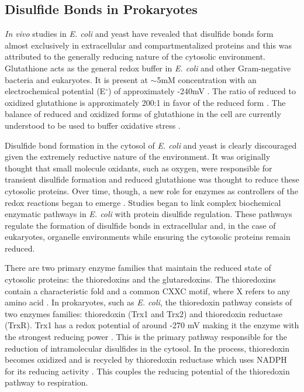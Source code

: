 {\subsection{Disulfide Bonds in Prokaryotes}

\emph{In vivo} studies in \emph{E. coli} and yeast have revealed that disulfide
bonds form almost exclusively in extracellular and compartmentalized proteins
and this was attributed to the generally reducing nature of the cytosolic 
environment. Glutathione acts as the general redox buffer in \emph{E.  coli} and
other Gram-negative bacteria and eukaryotes. It is present at $\sim$5mM
concentration with an electrochemical potential (E$^\circ$) of approximately
-240mV \cite{30}.  The ratio of reduced to oxidized glutathione is
approximately 200:1 in favor of the reduced form \cite{19}.  The balance of
reduced and oxidized forms of glutathione in the cell are currently understood
to be used to buffer oxidative stress \cite{31}.  

Disulfide bond formation in the cytosol of \emph{E. coli} and yeast is
clearly discouraged given the extremely reductive nature of the environment.
It was originally thought that small molecule oxidants, such as oxygen, were
responsible for transient disulfide formation and reduced glutathione was
thought to reduce these cytosolic proteins.  Over time, though, a new role for
enzymes as controllers of the redox reactions began to emerge
\cite{11,144,12,13,14,15,16,17,18,19,20}.  Studies began to link complex
biochemical enzymatic pathways in \emph{E. coli} with protein disulfide
regulation.  These pathways regulate the formation of disulfide bonds in
extracellular and, in the case of eukaryotes, organelle environments while
ensuring the cytosolic proteins remain reduced.  


There are two primary enzyme families that maintain the reduced state of
cytosolic proteins: the thioredoxins and the glutaredoxins.  The thioredoxins
contain a characteristic fold and a common CXXC motif, where X refers to any
amino acid \cite{25,carvalho2005sad,26,27}.  In prokaryotes, such as \emph{E.
coli}, the thioredoxin pathway consists of two enzymes families: thioredoxin
(Trx1 and Trx2) and thioredoxin reductase (TrxR). Trx1 has a redox potential of
around -270 mV making it the enzyme with the strongest reducing power
\cite{11}. This is the primary pathway responsible for the reduction of
intramolecular disulfides in the cytosol.  In the process, thioredoxin becomes
oxidized and is recycled by thioredoxin reductase which uses NADPH for its
reducing activity \cite{41}.  This couples the reducing potential of the
thioredoxin pathway to respiration.

}
